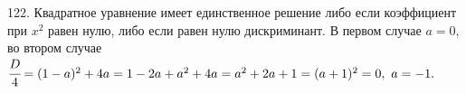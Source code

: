 122. Квадратное уравнение имеет единственное решение либо если коэффициент при $x^2$ равен нулю, либо если равен нулю дискриминант. В первом случае $a=0,$ во втором случае $\cfrac{D}{4}=(1-a)^2+4a=1-2a+a^2+4a=a^2+2a+1=(a+1)^2=0,\ a=-1.$\\
